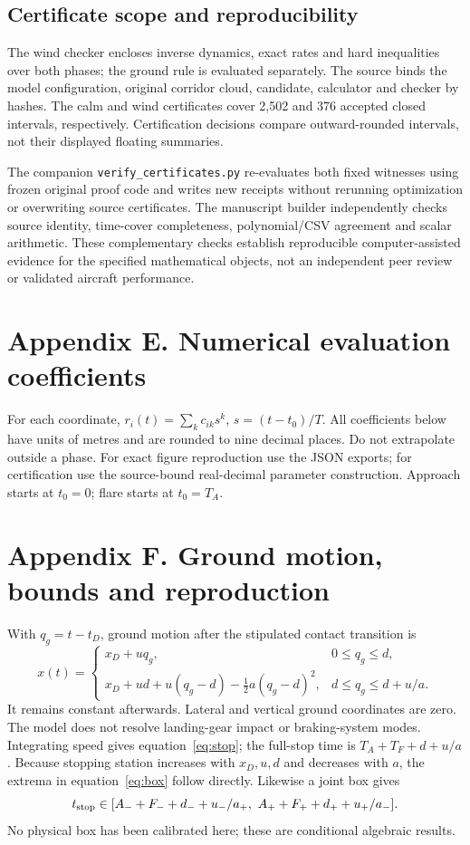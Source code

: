 \subsection*{Certificate scope and reproducibility}
The wind checker encloses inverse dynamics, exact rates and hard inequalities over both phases; the ground rule is evaluated separately. The source binds the model configuration, original corridor cloud, candidate, calculator and checker by hashes. The calm and wind certificates cover 2,502 and 376 accepted closed intervals, respectively. Certification decisions compare outward-rounded intervals, not their displayed floating summaries.

The companion \texttt{verify\_certificates.py} re-evaluates both fixed witnesses using frozen original proof code and writes new receipts without rerunning optimization or overwriting source certificates. The manuscript builder independently checks source identity, time-cover completeness, polynomial/CSV agreement and scalar arithmetic. These complementary checks establish reproducible computer-assisted evidence for the specified mathematical objects, not an independent peer review or validated aircraft performance.
\clearpage
\section{Appendix E. Numerical evaluation coefficients}\label{app:coefficients}
For each coordinate, $r_i(t)=\sum_k c_{ik}s^k$, $s=(t-t_0)/T$. All coefficients below have units of metres and are rounded to nine decimal places. Do not extrapolate outside a phase. For exact figure reproduction use the JSON exports; for certification use the source-bound real-decimal parameter construction. Approach starts at $t_0=0$; flare starts at $t_0=T_A$.

\section{Appendix F. Ground motion, bounds and reproduction}\label{app:ground}
With $q_g=t-t_D$, ground motion after the stipulated contact transition is
\[
x(t)=\begin{cases}
x_D+uq_g,&0\leq q_g\leq d,\\
x_D+ud+u(q_g-d)-\tfrac12a(q_g-d)^2,&d\leq q_g\leq d+u/a.
\end{cases}
\]
It remains constant afterwards. Lateral and vertical ground coordinates are zero. The model does not resolve landing-gear impact or braking-system modes. Integrating speed gives equation~\eqref{eq:stop}; the full-stop time is $T_A+T_F+d+u/a$. Because stopping station increases with $x_D,u,d$ and decreases with $a$, the extrema in equation~\eqref{eq:box} follow directly. Likewise a joint box gives
\[
t_{\rm stop}\in[A_-+F_-+d_-+u_-/a_+,\ A_++F_++d_++u_+/a_-].
\]
No physical box has been calibrated here; these are conditional algebraic results.


